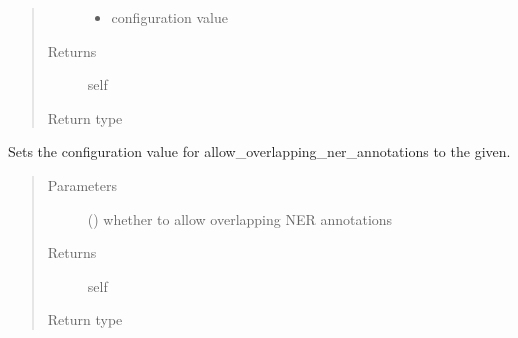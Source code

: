 \documentclass[letterpaper,10pt,english]{sphinxmanual}
\begin{document}
\begin{fulllineitems}
\begin{fulllineitems}
\begin{quote}
\begin{description}
\begin{itemize}
\item {} 
\sphinxAtStartPar
{} \textendash{} configuration value

\end{itemize}

\item[{Returns}] \leavevmode
\sphinxAtStartPar
self

\item[{Return type}] \leavevmode
\sphinxAtStartPar
{\hyperref[\detokenize{autoapi/pine/client/models/index:pine.client.models.CollectionBuilder}]{}}

\end{description}\end{quote}

\end{fulllineitems}


\begin{fulllineitems}
\label{\detokenize{autoapi/pine/client/index:pine.client.CollectionBuilder.allow_overlapping_ner_annotations}}
\sphinxAtStartPar
Sets the configuration value for allow\_overlapping\_ner\_annotations to the given.
\begin{quote}\begin{description}
\item[{Parameters}] \leavevmode
\sphinxAtStartPar
{} () \textendash{} whether to allow overlapping NER annotations

\item[{Returns}] \leavevmode
\sphinxAtStartPar
self

\item[{Return type}] \leavevmode
\sphinxAtStartPar
{\hyperref[\detokenize{autoapi/pine/client/models/index:pine.client.models.CollectionBuilder}]{}}


\end{description}
\end{quote}
\end{fulllineitems}
\end{fulllineitems}
\end{document}
